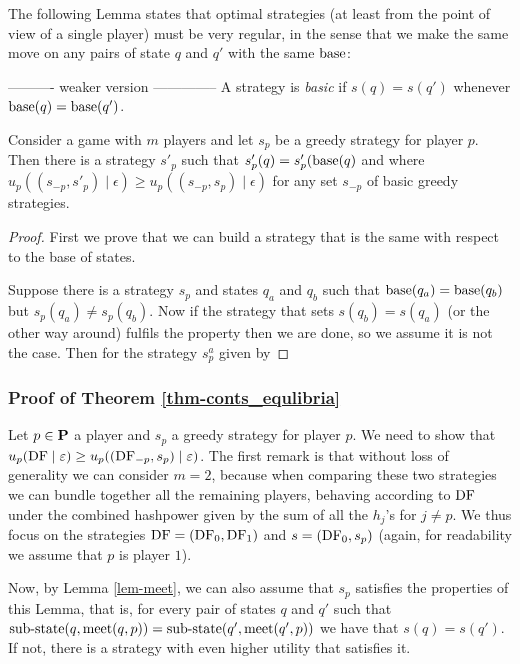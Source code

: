 The following Lemma states that optimal strategies (at least from the point of view of a single player) must be very regular, in the sense that 
we make the same move on any pairs of state $q$ and $q'$ with the same $\text{\rm base}$: 

---------- weaker version --------------
A strategy is \emph{basic} if $s(q) = s(q')$ whenever $\text{\rm base}(q) = \text{\rm base}(q')$. 
\begin{mylem}
\label{lem-meet}
Consider a game with $m$ players and let $s_p$ be a greedy strategy for player $p$. Then there is a strategy $s'_p$ such that $s'_p(q) = s'_p(\text{\rm base}(q)$ and where 
$u_p((s_{-p},s'_p) \mid \epsilon) \geq u_p((s_{-p},s_p) \mid \epsilon)$ for any set $s_{-p}$ of basic greedy strategies.  
\end{mylem}
\begin{proof}

First we prove that we can build a strategy that is the same with respect to the base of states. 

Suppose there is a strategy $s_p$ and states $q_a$ and $q_b$ such that $\text{\rm base}(q_a) = \text{\rm base}(q_b)$ but 
$s_p(q_a) \neq s_p(q_b)$. Now if the strategy that sets $s(q_b) = s(q_a)$ (or the other way around) fulfils the property then 
we are done, so we assume it is not the case. 
Then for the strategy $s_p^a$ given by 
\end{proof}





\subsubsection{Proof of Theorem \ref{thm-conts_equlibria}} 

Let $p \in \mathbf{P}$ a player and $s_p$ a greedy strategy for player $p$. We need to show that 
$u_p(\text{\rm DF} \mid \varepsilon) \geq u_p( (\text{\rm DF}_{-p},s_p) \mid \varepsilon)$. The first remark is that without loss of generality we can consider 
$m = 2$, because when comparing these two strategies we can bundle together all the remaining players, behaving according to $\text{\rm DF}$ 
under the combined hashpower given by the sum of all the $h_j$'s for $j \neq p$. We thus focus on the strategies 
$\text{\rm DF} = (\text{\rm DF}_0,\text{\rm DF}_1)$ and $s = (\text{\rm DF}_0,s_p)$ (again, for readability we assume that $p$ is player $1$). 

Now, by Lemma \ref{lem-meet}, we can also assume that $s_p$ satisfies the properties of this Lemma, that is, for every 
pair of states $q$ and $q'$ such that ${\text{\rm sub-state}}(q,\text{\rm meet}(q,p)) = {\text{\rm sub-state}}(q',\text{\rm meet}(q',p))$ we have that $s(q) = s(q')$. If not, there is a strategy with even higher utility that satisfies it. 


